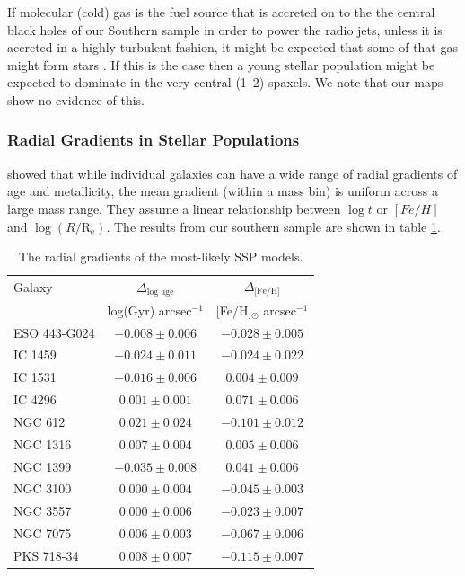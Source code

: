 		If molecular (cold) gas is the fuel source that is accreted on to the the central black holes of our Southern sample in order to power the radio jets, unless it is accreted in a highly turbulent fashion, it might be expected that some of that gas might form stars \citep[e.g.][]{Collin1999, Diamond-Stanic2012, LaMassa2013}. If this is the case then a young stellar population might be expected to dominate in the very central (1--2) spaxels. We note that our maps show no evidence of this. 


		\subsubsection{Radial Gradients in Stellar Populations}
			\label{subsubsec:popGrad}

			\citet{Koleva2011} showed that while individual galaxies can have a wide range of radial gradients of age and metallicity, the mean gradient (within a mass bin) is uniform across a large mass range. They assume a linear relationship between $\log t$ or $[Fe/H]$ and $\log (R/\mathrm{R_e})$. The results from our southern sample are shown in table \ref{tab:popGrad}. 

			\begin{table}
				\centering
				\caption{The radial gradients of the most-likely SSP models.}
				\label{tab:popGrad}
				\begin{tabular}{l c c}
					\hline
					\hline 
					Galaxy 	& $\Delta_\text{log age}$ & $\Delta_\text{[Fe/H]}$ \\ 
						& log(Gyr) arcsec$^{-1}$ & [Fe/H]$_\odot$ arcsec$^{-1}$ \\
					\hline
					ESO 443-G024 & $-0.008 \pm 0.006$ & $-0.028 \pm 0.005$ \\
					IC 1459 	& $-0.024 \pm 0.011$ & $-0.024 \pm 0.022$ \\
					IC 1531 	& $-0.016 \pm 0.006$ & $0.004 \pm 0.009$ \\
					IC 4296		& $0.001 \pm 0.001$ & $0.071 \pm 0.006$ \\
					NGC 612 	& $0.021 \pm 0.024$ & $-0.101 \pm 0.012$ \\
					NGC 1316 	& $0.007 \pm 0.004$ & $0.005 \pm 0.006$ \\
					NGC 1399 	& $-0.035 \pm 0.008$ & $0.041 \pm 0.006$ \\
					NGC 3100 	& $0.000 \pm 0.004$ & $-0.045 \pm 0.003$ \\
					NGC 3557 	& $0.000 \pm 0.006$ & $-0.023 \pm 0.007$ \\
					NGC 7075 	& $0.006 \pm 0.003$ & $-0.067 \pm 0.006$ \\
					PKS 718-34  & $0.008 \pm 0.007$ & $-0.115 \pm 0.007$ \\
					\hline
					\hline
				\end{tabular}
			\end{table}

